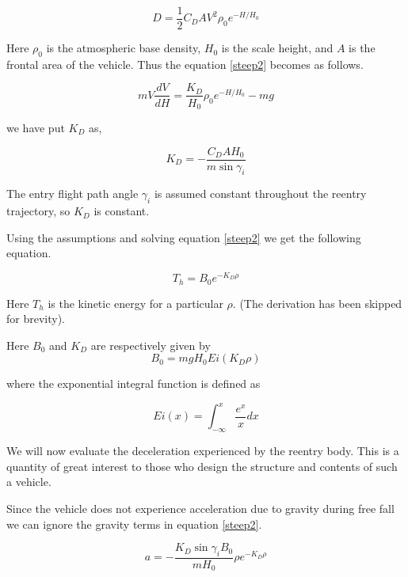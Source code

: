 \documentclass{article}
\theoremstyle{definition}
\begin{document}
\begin{equation}
    D = \frac{1}{2} C_D A V^2\rho_0 e^{-H/H_0}
\end{equation}

Here $\rho_0$ is the atmospheric base density, $H_0$ is the scale height, and $A$ is the frontal area of the vehicle. Thus the equation \ref{steep2} becomes as follows.

\begin{equation}
m V \frac{dV}{dH} =  \frac{K_D}{H_0}\rho_0 e^{-H/H_0} - mg
\end{equation}

we have put $K_D$ as,

\begin{equation}
    K_D  = -\frac{C_D A H_0}{m \sin{\gamma_i}}
\end{equation}

The entry flight path angle $\gamma_i$ is assumed constant throughout the reentry trajectory, so $K_D$ is constant.




Using the assumptions and solving equation \ref{steep2} we get the following equation.

\begin{equation}
T_h = B_0 e^{-K_D \rho}
\end{equation}

Here $T_h$ is the kinetic energy for a particular $\rho$.
(The derivation has been skipped for brevity).

Here $B_0$ and $K_D$ are respectively given by 
\begin{equation}
    B_0  = m g H_0 Ei(K_D \rho)
\end{equation}

where the exponential integral function is defined as

\begin{equation}
Ei(x) = \int_{-\infty}^x \frac{e^x}{x}dx
\end{equation}

We will now evaluate the deceleration experienced by the reentry body.
This is a quantity of great interest to those who design the structure and contents of such a vehicle.

Since the vehicle does not experience acceleration due to gravity during free fall we can ignore the gravity terms in equation \ref{steep2}.

\begin{equation}
    a = -\frac{K_D \sin{\gamma_i} B_0}{m H_0} \rho e^{-K_D \rho}
\end{equation}
\end{document}
